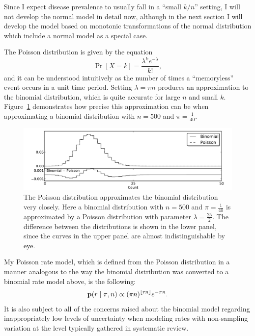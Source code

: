 Since I expect disease prevalence to usually fall in a ``small $k/n$''
setting, I will not develop the normal model in detail now, although
in the next section I will develop the model based on monotonic
transformations of the normal distribution which include a normal
model as a special case.

The Poisson distribution is given by the equation
\[
\Pr[X=k] =
\frac{\lambda^k e^{-\lambda}}{k!},
\]
and it can be understood intuitively as the number of times a
``memoryless'' event occurs in a unit time period.  Setting $\lambda
=\pi n$ produces an approximation to the binomial distribution, which
is quite accurate for large $n$ and small
$k$. Figure~\ref{rate-model-poisson-approx-to-binom} demonstrates how
precise this approximation can be when approximating a binomial
distribution with $n=500$ and $\pi=\frac{1}{40}$.

\begin{figure}[h]
\begin{center}
\includegraphics[width=\textwidth]{poisson_approx_to_binom.pdf}
\end{center}
\caption{The Poisson distribution approximates the binomial
  distribution very closely. Here a binomial distribution with $n=500$
  and $\pi=\frac{1}{40}$ is approximated by a Poisson distribution
  with parameter $\lambda=\frac{25}{2}$.  The difference between the
  distributions is shown in the lower panel, since the curves in the
  upper panel are almost indistinguishable by eye.}
\label{rate-model-poisson-approx-to-binom}
\end{figure}

My Poisson rate model, which is defined from the Poisson distribution
in a manner analogous to the way the binomial distribution was
converted to a binomial rate model above, is the following:
\[
\mathbf{p}(r\;|\; \pi,n) \propto 
(\pi n)^{\lfloor
  rn\rfloor} e^{-\pi n}.
\]
It is also subject to all of the concerns raised about the binomial
model regarding inappropriately low levels of uncertainty when
modeling rates with non-sampling variation at the level typically
gathered in systematic review.

